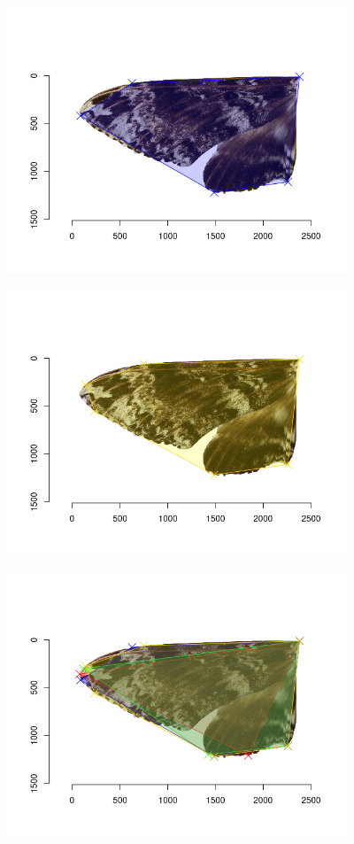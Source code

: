 \documentclass[
]{article}
\let\origfigure\figure
\let\endorigfigure\endfigure
\renewenvironment{figure}[1][2] {
    \expandafter\origfigure\expandafter[H]
} {
    \endorigfigure
}
\begin{document}
\begin{figure}
\centering
\includegraphics[width=\textwidth,height=3.125in]{./img/Areas_5_Manduca_rustica_left_wing.png}
\caption{Pentagon}
\end{figure}

\begin{figure}
\centering
\includegraphics[width=\textwidth,height=3.125in]{./img/Areas_6_Manduca_rustica_left_wing.png}
\caption{Hexagon}
\end{figure}

\begin{figure}
\centering
\includegraphics[width=\textwidth,height=3.125in]{./img/Areas_3_4_5_6_Manduca_rustica_left_wing.png}
\caption{Superposition of polygons}
\end{figure}
\end{document}
